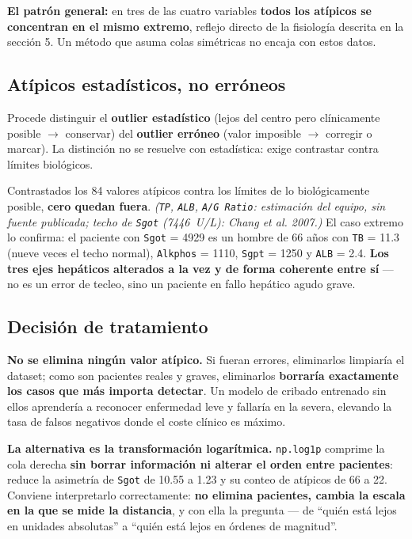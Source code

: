 \documentclass[10pt,a4paper]{article}
\begin{document}
\textbf{El patrón general:} en tres de las cuatro variables \textbf{todos los atípicos se concentran en el mismo extremo}, reflejo directo de la fisiología descrita en la sección 5. Un método que asuma colas simétricas no encaja con estos datos.

\subsection{Atípicos estadísticos, no erróneos}

Procede distinguir el \textbf{outlier estadístico} (lejos del centro pero clínicamente posible $\rightarrow$ conservar) del \textbf{outlier erróneo} (valor imposible $\rightarrow$ corregir o marcar). La distinción no se resuelve con estadística: exige contrastar contra límites biológicos.

Contrastados los 84 valores atípicos contra los límites de lo biológicamente posible, \textbf{cero quedan fuera}. \textit{(\texttt{TP}, \texttt{ALB}, \texttt{A/G Ratio}: estimación del equipo, sin fuente publicada; techo de \texttt{Sgot} (7446~U/L): Chang et al. 2007.)} El caso extremo lo confirma: el paciente con \texttt{Sgot} = 4929 es un hombre de 66 años con \texttt{TB} = 11.3 (nueve veces el techo normal), \texttt{Alkphos} = 1110, \texttt{Sgpt} = 1250 y \texttt{ALB} = 2.4. \textbf{Los tres ejes hepáticos alterados a la vez y de forma coherente entre sí} --- no es un error de tecleo, sino un paciente en fallo hepático agudo grave.

\subsection{Decisión de tratamiento}

\textbf{No se elimina ningún valor atípico.} Si fueran errores, eliminarlos limpiaría el dataset; como son pacientes reales y graves, eliminarlos \textbf{borraría exactamente los casos que más importa detectar}. Un modelo de cribado entrenado sin ellos aprendería a reconocer enfermedad leve y fallaría en la severa, elevando la tasa de falsos negativos donde el coste clínico es máximo.

\textbf{La alternativa es la transformación logarítmica.} \texttt{np.log1p} comprime la cola derecha \textbf{sin borrar información ni alterar el orden entre pacientes}: reduce la asimetría de \texttt{Sgot} de 10.55 a 1.23 y su conteo de atípicos de 66 a 22. Conviene interpretarlo correctamente: \textbf{no elimina pacientes, cambia la escala en la que se mide la distancia}, y con ella la pregunta --- de ``quién está lejos en unidades absolutas'' a ``quién está lejos en órdenes de magnitud''.
\end{document}
